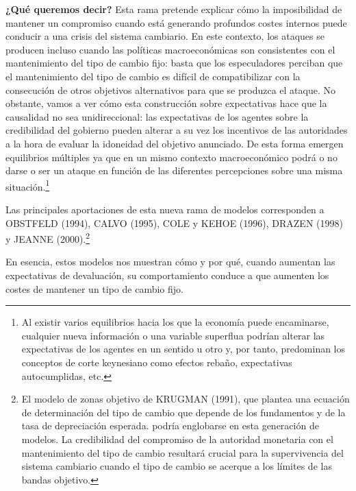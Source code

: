 \documentclass[10pt,a4paper]{article}
\begin{document}
\textbf{¿Qué queremos decir?} Esta rama pretende explicar cómo la imposibilidad de mantener un compromiso cuando está generando profundos costes internos puede conducir a una crisis del sistema cambiario. En este contexto, los ataques se producen incluso cuando las políticas macroeconómicas son consistentes con el mantenimiento del tipo de cambio fijo: basta que los especuladores perciban que el mantenimiento del tipo de cambio es difícil de compatibilizar con la consecución de otros objetivos alternativos para que se produzca el ataque. No obstante, vamos a ver cómo esta construcción sobre expectativas hace que la causalidad no sea unidireccional: las expectativas de los agentes sobre la credibilidad del gobierno pueden alterar a su vez los incentivos de las autoridades a la hora de evaluar la idoneidad del objetivo anunciado. De esta forma emergen equilibrios múltiples ya que en un mismo contexto macroeconómico podrá o no darse o ser un ataque en función de las diferentes percepciones sobre una misma situación.\footnote{%
    Al existir varios equilibrios hacia los que la economía puede encaminarse, cualquier nueva información o una variable superflua podrían alterar las expectativas de los agentes en un sentido u otro y, por tanto, predominan los conceptos de corte keynesiano como efectos rebaño, expectativas autocumplidas, etc.
} 

Las principales aportaciones de esta nueva rama de modelos corresponden a OBSTFELD (1994), CALVO (1995), COLE y KEHOE (1996), DRAZEN (1998) y JEANNE (2000).\footnote{%
    El modelo de zonas objetivo de KRUGMAN (1991), que plantea una ecuación de determinación del tipo de cambio que depende de los fundamentos y de la tasa de depreciación esperada. podría englobarse en esta generación de modelos. La credibilidad del compromiso de la autoridad monetaria con el mantenimiento del tipo de cambio resultará crucial para la supervivencia del sistema cambiario cuando el tipo de cambio se acerque a los límites de las bandas objetivo.
}

En esencia, estos modelos nos muestran cómo y por qué, cuando aumentan las expectativas de devaluación, su comportamiento conduce a que aumenten los costes de mantener un tipo de cambio fijo.
\end{document}
